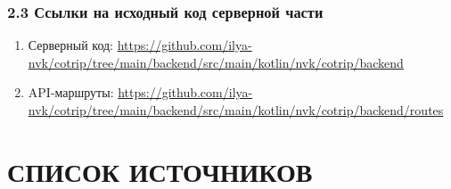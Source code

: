 \documentclass[12pt,a4paper]{article}
\begin{document}
\subsubsection*{2.3 Ссылки на исходный код серверной части}
\begin{enumerate}
  \item Серверный код: \url{https://github.com/ilya-nvk/cotrip/tree/main/backend/src/main/kotlin/nvk/cotrip/backend}
  \item API-маршруты: \url{https://github.com/ilya-nvk/cotrip/tree/main/backend/src/main/kotlin/nvk/cotrip/backend/routes}
\end{enumerate}

\clearpage
\section*{СПИСОК ИСТОЧНИКОВ}
\end{document}
